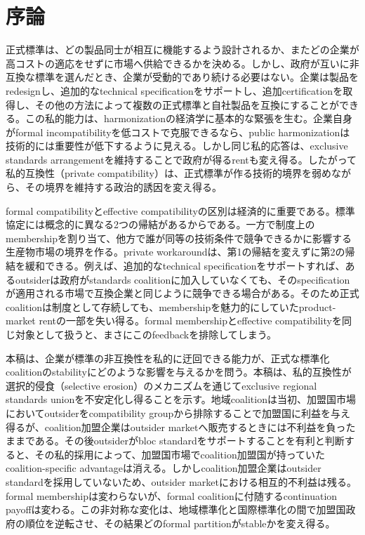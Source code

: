 \section{序論}
\label{sec:introduction}

正式標準は、どの製品同士が相互に機能するよう設計されるか、またどの企業が高コストの適応をせずに市場へ供給できるかを決める。しかし、政府が互いに非互換な標準を選んだとき、企業が受動的であり続ける必要はない。企業は製品をredesignし、追加的なtechnical specificationをサポートし、追加certificationを取得し、その他の方法によって複数の正式標準と自社製品を互換にすることができる。この私的能力は、harmonizationの経済学に基本的な緊張を生む。企業自身がformal incompatibilityを低コストで克服できるなら、public harmonizationは技術的には重要性が低下するように見える。しかし同じ私的応答は、exclusive standards arrangementを維持することで政府が得るrentも変え得る。したがって私的互換性（private compatibility）は、正式標準が作る技術的境界を弱めながら、その境界を維持する政治的誘因を変え得る。

formal compatibilityとeffective compatibilityの区別は経済的に重要である。標準協定には概念的に異なる2つの帰結があるからである。一方で制度上のmembershipを割り当て、他方で誰が同等の技術条件で競争できるかに影響する生産物市場の境界を作る。private workaroundは、第1の帰結を変えずに第2の帰結を緩和できる。例えば、追加的なtechnical specificationをサポートすれば、あるoutsiderは政府がstandards coalitionに加入していなくても、そのspecificationが適用される市場で互換企業と同じように競争できる場合がある。そのため正式coalitionは制度として存続しても、membershipを魅力的にしていたproduct-market rentの一部を失い得る。formal membershipとeffective compatibilityを同じ対象として扱うと、まさにこのfeedbackを排除してしまう。

本稿は、企業が標準の非互換性を私的に迂回できる能力が、正式な標準化coalitionのstabilityにどのような影響を与えるかを問う。本稿は、私的互換性が選択的侵食（selective erosion）のメカニズムを通じてexclusive regional standards unionを不安定化し得ることを示す。地域coalitionは当初、加盟国市場においてoutsiderをcompatibility groupから排除することで加盟国に利益を与え得るが、coalition加盟企業はoutsider marketへ販売するときには不利益を負ったままである。その後outsiderがbloc standardをサポートすることを有利と判断すると、その私的採用によって、加盟国市場でcoalition加盟国が持っていたcoalition-specific advantageは消える。しかしcoalition加盟企業はoutsider standardを採用していないため、outsider marketにおける相互的不利益は残る。formal membershipは変わらないが、formal coalitionに付随するcontinuation payoffは変わる。この非対称な変化は、地域標準化と国際標準化の間で加盟国政府の順位を逆転させ、その結果どのformal partitionがstableかを変え得る。

